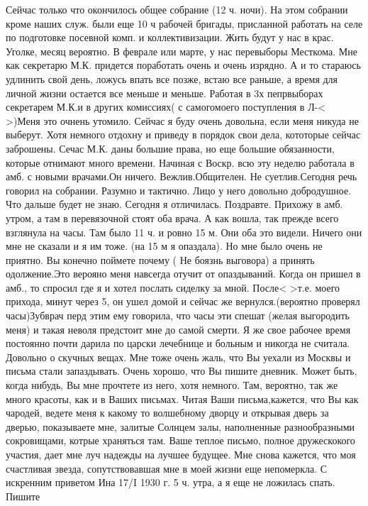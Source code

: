 \documentclass[]{memoir}
\begin{document}
Сейчас только что окончилось общее собрание (12 ч. ночи). На этом собрании кроме наших служ. были еще 10 ч рабочей бригады, присланной работать на селе по подготовке посевной комп. и коллективизации. Жить будут у нас в крас. Уголке, месяц вероятно. В феврале или марте, у нас перевыборы Месткома. Мне как секретарю М.К. придется поработать очень и очень изрядно. А и то стараюсь удлинить свой день, ложусь впать все позже, встаю все раньше, а время для личной жизни остается все меньше и меньше. Работая в 3х пепрвыборах секретарем М.К.и в других комиссиях( с самогомоего поступления в Л-< >)Меня это очнень утомило. Сейчас я буду очень довольна, если меня никуда не выберут. Хотя немного отдохну и приведу в порядок свои дела, кототорые сейчас заброшены. Сечас М.К. даны большие права, но еще большие обязанности, которые отнимают много времени. Начиная с Воскр. всю эту неделю работала в амб. с новыми врачами.Он ничего. Вежлив.Общителен. Не суетлив.Сегодня речь говорил на собрании. Разумно и тактично. Лицо у него довольно добродушное. Что дальше будет не знаю. Сегодня я отличилась. Поздравте.
Прихожу в амб. утром, а там в перевязочной стоят оба врача. А как вошла, так прежде всего взглянула на часы. Там было 11 ч. и ровно 15 м. Они оба это видели. Ничего они мне не сказали и я им тоже. (на 15 м я опаздала). Но мне было очень не приятно. Вы конечно поймете почему ( Не боязнь выговора) а принять одолжение.Это верояно меня навсегда отучит от опаздываний. Когда он пришел в амб., то спросил где я и хотел послать сиделку за мной. После< >т.е. моего прихода, минут через 5, он ушел домой и сейчас же вернулся.(вероятно проверял часы)Зубврач перд этим ему говорила, что часы эти спешат (желая выгородить меня) и такая неволя предстоит мне до самой смерти. Я же свое рабочее время постоянно почти дарила по царски лечебнице и больным и никогда не считала.
Довольно о скучных вещах.
Мне тоже очень жаль, что Вы уехали из Москвы и письма стали запаздывать. Очень хорошо, что Вы пишите дневник. Может быть, когда нибудь, Вы мне прочтете из него, хотя немного. Там, вероятно, так же много красоты, как и в Ваших письмах.
Читая Ваши письма,кажется, что Вы как чародей, ведете меня к какому то волшебному дворцу и открывая дверь за дверью, показываете мне, залитые Солнцем залы, наполненные разнообразными сокровищами, котрые храняться там.
Ваше теплое письмо, полное дружескокого участия, дает мне луч надежды на лучшее будущее. Мне снова кажется, что моя счастливая звезда, сопутствовавшая мне в моей жизни еще непомеркла.
С искренним приветом Ина
17/I 1930 г.
5 ч. утра, а я еще не ложилась спать.
Пишите
\end{document}
